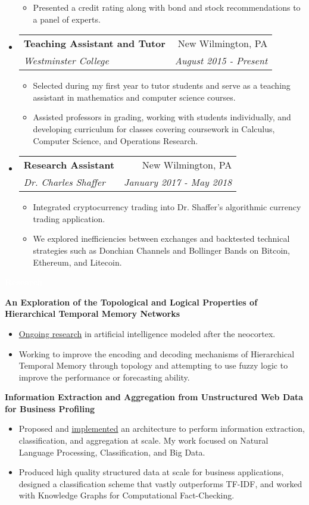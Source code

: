 \documentclass[letterpaper,11pt]{article}
\makeatletter
\newcommand{\resitem}[1]{\item #1 \vspace{-2pt}}
\newcommand{\resheading}[1]{{\large \colorbox{mypurple}{\begin{minipage}{\textwidth}{\textbf{#1 \vphantom{p\^{E}}}}\end{minipage}}}}
\newcommand{\ressubheading}[4]{
	\begin{tabular*}{7.0in}{l@{\extracolsep{\fill}}r}
		\textbf{#1} & #2 \\
		\textit{#3} & \textit{#4} \\
	\end{tabular*}\vspace{-6pt}}
\makeatother
\begin{document}
\begin{itemize}
\begin{itemize}
			\resitem{Presented a credit rating along with bond and stock recommendations to a panel of experts.}
		\end{itemize}	
	\item
		\ressubheading{Teaching Assistant and Tutor}{New Wilmington, PA}{Westminster College}{August 2015 - Present}
		\begin{itemize}
			\resitem{Selected during my first year to tutor students and serve as a teaching assistant in mathematics and computer science courses.}
			\resitem{Assisted professors in grading, working with students individually, and developing curriculum for classes covering coursework in Calculus, Computer Science, and Operations Research.}
		\end{itemize}
		
		\item
		\ressubheading{Research Assistant}{New Wilmington, PA}{Dr. Charles Shaffer}{January 2017 - May 2018}
		\begin{itemize}
			\resitem{Integrated cryptocurrency trading into Dr. Shaffer's algorithmic currency trading application.}
			\resitem{We explored inefficiencies between exchanges and backtested technical strategies such as Donchian Channels and Bollinger Bands on Bitcoin, Ethereum, and Litecoin.}
		\end{itemize}
		
		\pagebreak
		
	\end{itemize}
	
	\resheading{\textcolor{white}{Research}}
	
		\vspace{0.1in}

		\textbf{An Exploration of the Topological and Logical Properties of Hierarchical Temporal Memory Networks}
		\begin{itemize}
			\resitem{\href{https://github.com/alexandermichels/HonorsResearch}{Ongoing research} in artificial intelligence modeled after the neocortex.}
			\resitem{Working to improve the encoding and decoding mechanisms of Hierarchical Temporal Memory through topology and attempting to use fuzzy logic to improve the performance or forecasting ability.}
		\end{itemize}
		
		\textbf{Information Extraction and Aggregation from Unstructured Web Data for Business Profiling}
		\begin{itemize}
			\resitem{Proposed and \href{https://github.com/himahuja/pcatxcore}{implemented} an architecture to perform information extraction, classification, and aggregation at scale. My work focused on Natural Language Processing, Classification, and Big Data.}
			\resitem{Produced high quality structured data at scale for business applications, designed a classification scheme that vastly outperforms TF-IDF, and worked with Knowledge Graphs for Computational Fact-Checking.}
		\end{itemize}
\end{document}

